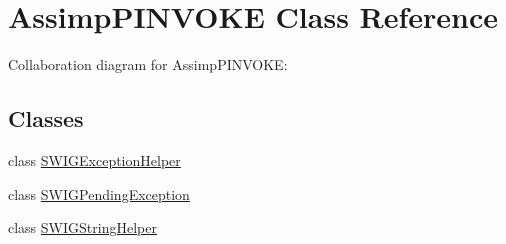 \hypertarget{class_assimp_p_i_n_v_o_k_e}{\section{Assimp\+P\+I\+N\+V\+O\+K\+E Class Reference}
\label{class_assimp_p_i_n_v_o_k_e}
}


Collaboration diagram for Assimp\+P\+I\+N\+V\+O\+K\+E\+:
\subsection*{Classes}
\begin{DoxyCompactItemize}
\item 
class \hyperlink{class_assimp_p_i_n_v_o_k_e_1_1_s_w_i_g_exception_helper}{S\+W\+I\+G\+Exception\+Helper}
\item 
class \hyperlink{class_assimp_p_i_n_v_o_k_e_1_1_s_w_i_g_pending_exception}{S\+W\+I\+G\+Pending\+Exception}
\item 
class \hyperlink{class_assimp_p_i_n_v_o_k_e_1_1_s_w_i_g_string_helper}{S\+W\+I\+G\+String\+Helper}
\end{DoxyCompactItemize}
